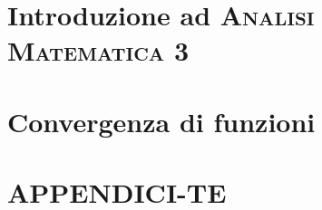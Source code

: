 \documentclass[a4paper, 11pt, twoside, openright, italian]{memoir}
\begin{document}
\frontmatter




\mainmatter

\part{Introduzione ad \textsc{Analisi Matematica 3}}

\part{Convergenza di funzioni}


%
%
%
%
%
%
%
%
%
\part{APPENDICI-TE}

%

%
\backmatter

\end{document}
